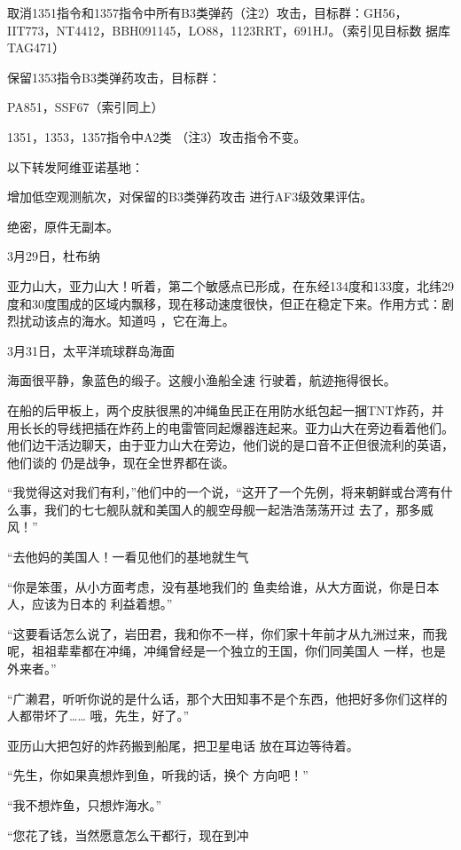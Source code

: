 \documentclass{article}
\begin{document}
取消1351指令和1357指令中所有B3类弹药（注2）攻击，目标群：GH56，IIT773，NT4412，BBH091145，LO88，1123RRT，691HJ。（索引见目标数
据库TAG471） 

保留1353指令B3类弹药攻击，目标群：
\newpage

PA851，SSF67（索引同上） 

1351，1353，1357指令中A2类
（注3）攻击指令不变。 


以下转发阿维亚诺基地： 

增加低空观测航次，对保留的B3类弹药攻击
进行AF3级效果评估。 


绝密，原件无副本。 



3月29日，杜布纳 

亚力山大，亚力山大！听着，第二个敏感点已形成，在东经134度和133度，北纬29度和30度围成的区域内飘移，现在移动速度很快，但正在稳定下来。作用方式：剧烈扰动该点的海水。知道吗
，它在海上。 

\newpage



3月31日，太平洋琉球群岛海面 

海面很平静，象蓝色的缎子。这艘小渔船全速
行驶着，航迹拖得很长。 

在船的后甲板上，两个皮肤很黑的冲绳鱼民正在用防水纸包起一捆TNT炸药，并用长长的导线把插在炸药上的电雷管同起爆器连起来。亚力山大在旁边看着他们。他们边干活边聊天，由于亚力山大在旁边，他们说的是口音不正但很流利的英语，他们谈的
仍是战争，现在全世界都在谈。 

“我觉得这对我们有利，”他们中的一个说，“这开了一个先例，将来朝鲜或台湾有什么事，我们的七七舰队就和美国人的舰空母舰一起浩浩荡荡开过
去了，那多威风！” 

“去他妈的美国人！一看见他们的基地就生气

“你是笨蛋，从小方面考虑，没有基地我们的
\newpage
鱼卖给谁，从大方面说，你是日本人，应该为日本的
利益着想。” 

“这要看话怎么说了，岩田君，我和你不一样，你们家十年前才从九洲过来，而我呢，祖祖辈辈都在冲绳，冲绳曾经是一个独立的王国，你们同美国人
一样，也是外来者。” 

“广濑君，听听你说的是什么话，那个大田知事不是个东西，他把好多你们这样的人都带坏了……
哦，先生，好了。” 

亚历山大把包好的炸药搬到船尾，把卫星电话
放在耳边等待着。 

“先生，你如果真想炸到鱼，听我的话，换个
方向吧！” 


“我不想炸鱼，只想炸海水。” 

“您花了钱，当然愿意怎么干都行，现在到冲
\newpage
\end{document}
